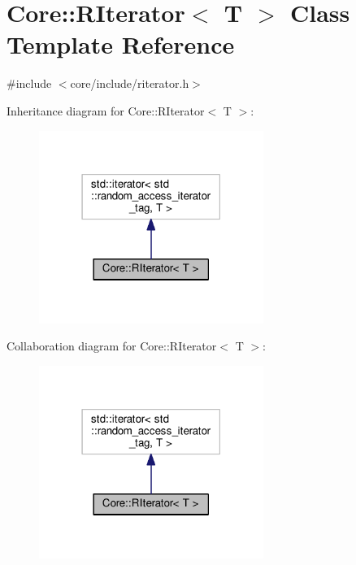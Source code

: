 \hypertarget{classCore_1_1RIterator}{}\section{Core\+:\+:R\+Iterator$<$ T $>$ Class Template Reference}
\label{classCore_1_1RIterator}


{\ttfamily \#include $<$core/include/riterator.\+h$>$}



Inheritance diagram for Core\+:\+:R\+Iterator$<$ T $>$\+:\nopagebreak
\begin{figure}[H]
\begin{center}
\leavevmode
\includegraphics[width=207pt]{classCore_1_1RIterator__inherit__graph}
\end{center}
\end{figure}


Collaboration diagram for Core\+:\+:R\+Iterator$<$ T $>$\+:\nopagebreak
\begin{figure}[H]
\begin{center}
\leavevmode
\includegraphics[width=207pt]{classCore_1_1RIterator__coll__graph}
\end{center}
\end{figure}

